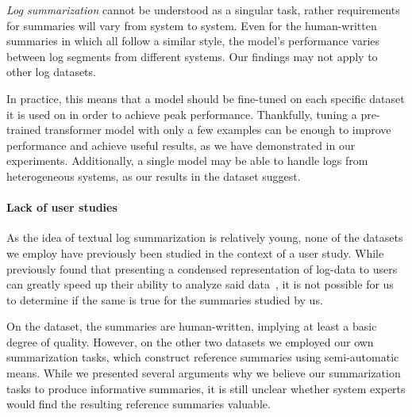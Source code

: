 \emph{Log summarization} cannot be understood as a singular task,
rather requirements for summaries will vary from system to system.
Even for the human-written summaries in \logsummary{} which all follow a similar style,
the model's performance varies between log segments from different systems.
Our findings may not apply to other log datasets.

In practice, this means that a model should be fine-tuned on each specific dataset it is used on in order to achieve peak performance.
Thankfully,
tuning a pre-trained transformer model with only a few examples can be enough to improve performance and achieve useful results,
as we have demonstrated in our experiments.
Additionally, a single model may be able to handle logs from heterogeneous systems, as our results in the \logsummary{} dataset suggest.

\paragraph{Lack of user studies}

As the idea of textual log summarization is relatively young,
none of the datasets we employ have previously been studied in the context of a user study.
While \citeauthor*{log_analysis} previously found that presenting a condensed representation of log-data to users
can greatly speed up their ability to analyze said data~\parencite{log_analysis},
it is not possible for us to determine if the same is true for the summaries studied by us.

On the \logsummary{} dataset, the summaries are human-written, implying at least a basic degree of quality.
However, on the other two datasets we employed our own summarization tasks,
which construct reference summaries using semi-automatic means.
While we presented several arguments why we believe our summarization tasks to produce informative summaries,
it is still unclear whether system experts would find the resulting reference summaries valuable.
